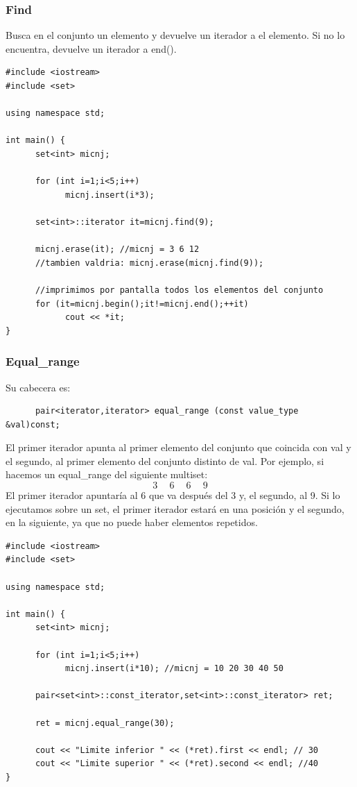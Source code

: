 \documentclass[10pt,a4paper,spanish]{report}
\begin{document}
\subsubsection{\textcolor[rgb]{0.2,0.5,0.5}Find}
\noindent
Busca en el conjunto un elemento y devuelve un iterador a el elemento. Si no lo encuentra, devuelve un iterador a end().

\begin{verbatim}
#include <iostream>
#include <set>

using namespace std;

int main() {
      set<int> micnj;

      for (int i=1;i<5;i++)
            micnj.insert(i*3);

      set<int>::iterator it=micnj.find(9);

      micnj.erase(it); //micnj = 3 6 12
      //tambien valdria: micnj.erase(micnj.find(9));

      //imprimimos por pantalla todos los elementos del conjunto
      for (it=micnj.begin();it!=micnj.end();++it)
            cout << *it;
}
\end{verbatim}

\subsubsection{\textcolor[rgb]{0.2,0.5,0.5}Equal\_range}
\noindent
Su cabecera es:
\begin{verbatim}
      pair<iterator,iterator> equal_range (const value_type &val)const;
\end{verbatim}

\noindent
El primer iterador apunta al primer elemento del conjunto que coincida con val y el segundo, al primer elemento del conjunto distinto de val. Por ejemplo, si hacemos un equal\_range del siguiente multiset:
\begin{displaymath}
3 \quad\ 6 \quad\ 6 \quad\ 9
\end{displaymath}
El primer iterador apuntaría al 6 que va después del 3 y, el segundo, al 9. Si lo ejecutamos sobre un set, el primer iterador estará en una posición y el segundo, en la siguiente, ya que no puede haber elementos repetidos.

\begin{verbatim}
#include <iostream>
#include <set>

using namespace std;

int main() {
      set<int> micnj;

      for (int i=1;i<5;i++)
            micnj.insert(i*10); //micnj = 10 20 30 40 50

      pair<set<int>::const_iterator,set<int>::const_iterator> ret;

      ret = micnj.equal_range(30);

      cout << "Limite inferior " << (*ret).first << endl; // 30
      cout << "Limite superior " << (*ret).second << endl; //40
}
\end{verbatim}
\end{document}
